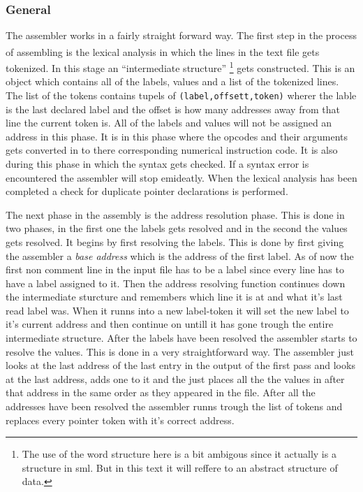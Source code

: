 \documentclass{article}
\begin{document}
\subsubsection{General}
The assembler works in a fairly straight forward way. The first step in the
process of assembling is the lexical
analysis\textsuperscript{\cite{lexi}} in which the lines in the text file gets
tokenized. In this stage an ``intermediate structure'' \footnote{The use of the word structure here is a bit ambigous since it
actually is a structure in sml. But in this text it will reffere to an abstract
structure of data.} gets constructed.
This is an object which contains all of the labels, values and a list of the
tokenized lines. The list of the tokens contains tupels of
\verb+(label,offsett,token)+ wherer the lable is the last declared label and
the offset is how many addresses away from that line the current token is. All
of the labels and values will not be assigned an address in this phase. It is in
this phase where the opcodes and their arguments gets converted in to there
corresponding numerical instruction code. It is also during this phase in which
the syntax gets checked. If a syntax error is encountered the assembler will
stop emideatly. When the lexical analysis has been completed a check for
duplicate pointer declarations is performed.

The next phase in the assembly is the address resolution phase. This is done in
two phases, in the first one the labels gets resolved and in the second the
values gets  resolved. It begins by first resolving the labels.
This is done by first giving the assembler a \emph{base address} which is
the address of the first label. As of now the first
non comment line in the input file has to be a label since every line has to
have a label assigned to it. Then the address resolving function continues
down the intermediate sturcture and remembers which line it is at and what it's
last read label was. When it runns into a new label-token it will set the new
label to it's current address and then continue on untill it has gone trough the entire
intermediate structure. After the labels have been resolved the assembler starts
to resolve the values. This is done in a very straightforward way. The assembler
just looks at the last address of the last entry in the output of the first
pass and looks at the last address, adds one to it and the just places all the
the values in after that address in the same order as they appeared in the file.
After all the addresses have been resolved the assembler runns trough the list
of tokens and replaces every pointer token with it's correct address.
\end{document}
